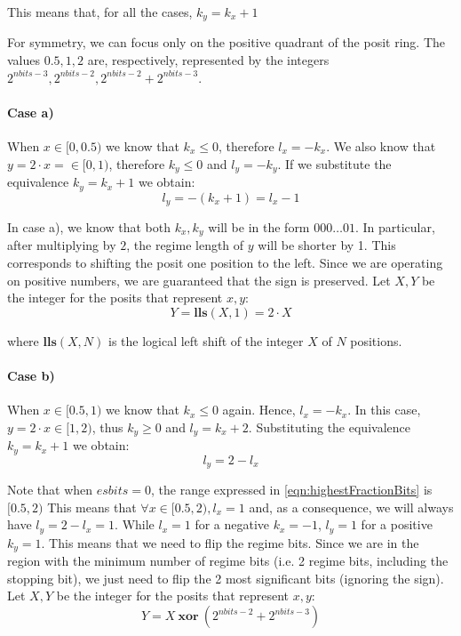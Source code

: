 This means that, for all the cases, $k_y = k_x + 1$

For symmetry, we can focus only on the positive quadrant of the posit ring. The values $0.5,1,2$ are, respectively, represented by the integers $2^{nbits - 3}, 2^{nbits - 2}, 2^{nbits - 2} + 2^{nbits - 3}$.

\paragraph{Case a)} When $x \in [0,0.5)$ we know that $k_x \leq 0$, therefore $l_x = -k_x$. We also know that $y = 2\cdot x = \in [0,1)$, therefore $k_y \leq 0$ and $l_y = -k_y$. If we substitute the equivalence  $k_y = k_x + 1$ we obtain:
\begin{equation}
    l_y = - (k_x + 1) = l_x - 1
\end{equation}


In case a), we know that both $k_x, k_y$ will be in the form $000 \dots 01$. In particular, after multiplying by $2$, the regime length of $y$ will be shorter by 1. This corresponds to shifting the posit one position to the left. Since we are operating on positive numbers, we are guaranteed that the sign is preserved. Let $X,Y$ be the integer for the posits that represent $x,y$:
\begin{equation}
    Y = \mathbf{lls} (X,1) = 2 \cdot X
\end{equation}

where $\mathbf{lls}(X,N)$ is the logical left shift of the integer $X$ of $N$ positions.

\paragraph{Case b)} When $x \in [0.5,1)$ we know that $k_x \leq 0$ again. Hence, $l_x = -k_x$. In this case, $y = 2\cdot x \in [1,2)$, thus $k_y \geq 0$ and $l_y = k_x + 2$. Substituting the equivalence $k_y = k_x + 1$ we obtain:
\begin{equation}
    l_y = 2 - l_x
\end{equation}

Note that when $esbits = 0$, the range expressed in \eqref{eqn:highestFractionBits} is $[0.5,2)$ This means that $\forall x \in [0.5,2), l_x = 1$ and, as a consequence, we will always have $l_y = 2 - l_x = 1$. While $l_x = 1$ for a negative $k_x = -1$, $l_y = 1$ for a positive $k_y = 1$. This means that we need to flip the regime bits. Since we are in the region with the minimum number of regime bits (i.e. 2 regime bits, including the stopping bit), we just need to flip the 2 most significant bits (ignoring the sign). Let $X,Y$ be the integer for the posits that represent $x,y$:
\begin{equation}
    Y = X\ \mathbf{xor}\ (2^{nbits - 2} + 2^{nbits - 3})
\end{equation}


